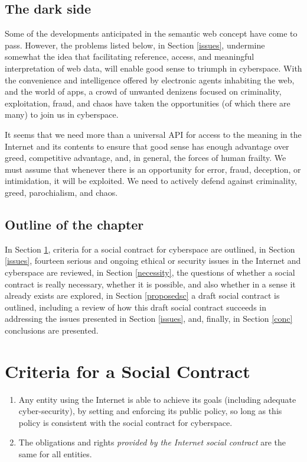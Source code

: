 \subsection{The dark side}

Some of the developments anticipated in the semantic web concept have come to pass. However, the problems listed below, in Section \ref{issues}, undermine somewhat the idea that facilitating reference, access, and meaningful interpretation of web data, will enable good sense to triumph in cyberspace. With the convenience and intelligence offered by electronic agents inhabiting the web, and the world of apps, a crowd of unwanted denizens focused on criminality, exploitation, fraud, and chaos have taken the opportunities (of which there are many) to join us in cyberspace.

It seems that we need more than a universal API for access to the meaning in the Internet and its contents to ensure that good sense has enough advantage over greed, competitive advantage, and, in general, the forces of human frailty. We must assume that whenever there is an opportunity for error, fraud, deception, or intimidation, it will be exploited. We need to actively defend against criminality, greed, parochialism, and chaos.

\subsection{Outline of the chapter}

In Section \ref{criteria}, criteria for a social contract for cyberspace are outlined, in Section \ref{issues}, fourteen serious and ongoing ethical or security issues in the Internet and cyberspace are reviewed, in Section \ref{necessity}, the questions of whether a social contract is really necessary, whether it is possible, and also whether in a sense it already exists are explored, in Section \ref{proposedsc} a draft social contract is outlined, including a review of how this draft social contract succeeds in addressing the issues presented in Section \ref{issues}, and, finally, in Section \ref{conc} conclusions are presented.

\section{Criteria for a Social Contract}\label{criteria}

\begin{enumerate}[C-1.]

\item\label{canachieve} Any entity using the Internet is able to achieve its goals (including adequate cyber-security), by setting and enforcing its public policy, so long as this policy is consistent with the social contract for cyberspace.

\item\label{sameforall} The obligations and rights {\em provided by the Internet social contract} are the same for all entities.
\end{enumerate}

